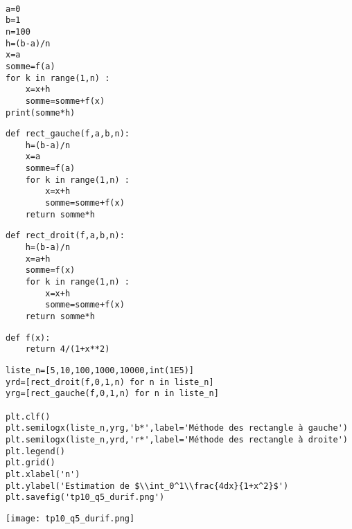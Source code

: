 \exer{[INT-002]}
\setcounter{numques}{0}~\\


\question{}

\begin{lstlisting}
a=0
b=1
n=100
h=(b-a)/n
x=a
somme=f(a)
for k in range(1,n) :
    x=x+h
    somme=somme+f(x)
print(somme*h)

\end{lstlisting}

\question{} 

\begin{lstlisting}
def rect_gauche(f,a,b,n):
    h=(b-a)/n
    x=a
    somme=f(a)
    for k in range(1,n) :
        x=x+h
        somme=somme+f(x)
    return somme*h

\end{lstlisting}

\question{}


\begin{lstlisting}
def rect_droit(f,a,b,n):
    h=(b-a)/n
    x=a+h
    somme=f(x)
    for k in range(1,n) :
        x=x+h
        somme=somme+f(x)
    return somme*h

\end{lstlisting}

\question{} 

\begin{lstlisting}
def f(x):
    return 4/(1+x**2)
\end{lstlisting}

\question{}


\begin{minipage}{0.5\textwidth}
\begin{lstlisting}
liste_n=[5,10,100,1000,10000,int(1E5)]
yrd=[rect_droit(f,0,1,n) for n in liste_n]
yrg=[rect_gauche(f,0,1,n) for n in liste_n]

plt.clf()
plt.semilogx(liste_n,yrg,'b*',label='Méthode des rectangle à gauche')
plt.semilogx(liste_n,yrd,'r*',label='Méthode des rectangle à droite')
plt.legend()
plt.grid()
plt.xlabel('n')
plt.ylabel('Estimation de $\\int_0^1\\frac{4dx}{1+x^2}$')
plt.savefig('tp10_q5_durif.png')
\end{lstlisting}
\end{minipage}
\begin{minipage}{0.5\textwidth}
\texttt{[image: tp10\_q5\_durif.png]}
\end{minipage}



